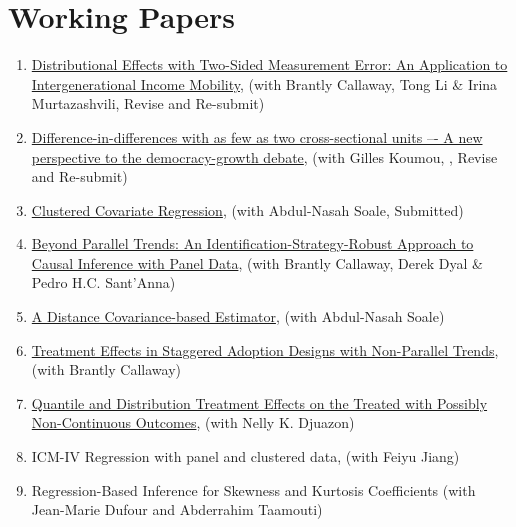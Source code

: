 \documentclass[12pt,letterpaper]{article}
\begin{document}
\section*{Working Papers}
\begin{enumerate}
    
    \item \href{https://arxiv.org/pdf/2107.09235}{Distributional Effects with Two-Sided Measurement Error: An Application to Intergenerational Income Mobility}, (with Brantly Callaway, Tong Li \& Irina Murtazashvili, Revise and Re-submit)
    
    \item \href{https://arxiv.org/pdf/2408.13047}{Difference-in-differences with as few as two cross-sectional units –- A new perspective to the democracy-growth debate}, (with Gilles Koumou, , Revise and Re-submit)
    
    \item \href{https://arxiv.org/pdf/2302.09255.pdf}{Clustered Covariate Regression}, (with Abdul-Nasah Soale, Submitted)
  
    \item \href{https://arxiv.org/pdf/2511.21977}{Beyond Parallel Trends: An Identification-Strategy-Robust
Approach to Causal Inference with Panel Data}, (with Brantly Callaway, Derek Dyal & Pedro H.C. Sant’Anna)
    
    \item \href{https://arxiv.org/pdf/2102.07008.pdf}{A Distance Covariance-based Estimator}, (with Abdul-Nasah Soale)
    
    \item \href{https://arxiv.org/pdf/2308.02899.pdf}{Treatment Effects in Staggered Adoption Designs with Non-Parallel Trends}, (with Brantly Callaway)
  
    \item \href{https://arxiv.org/pdf/2408.07842}{Quantile and Distribution Treatment Effects on the Treated with Possibly Non-Continuous Outcomes}, (with Nelly K. Djuazon)
	
	  \item ICM-IV Regression with panel and clustered data, (with Feiyu Jiang) %

    \item Regression-Based Inference for Skewness and Kurtosis Coefficients (with Jean-Marie Dufour and Abderrahim Taamouti)
	
	
\end{enumerate}
\end{document}
